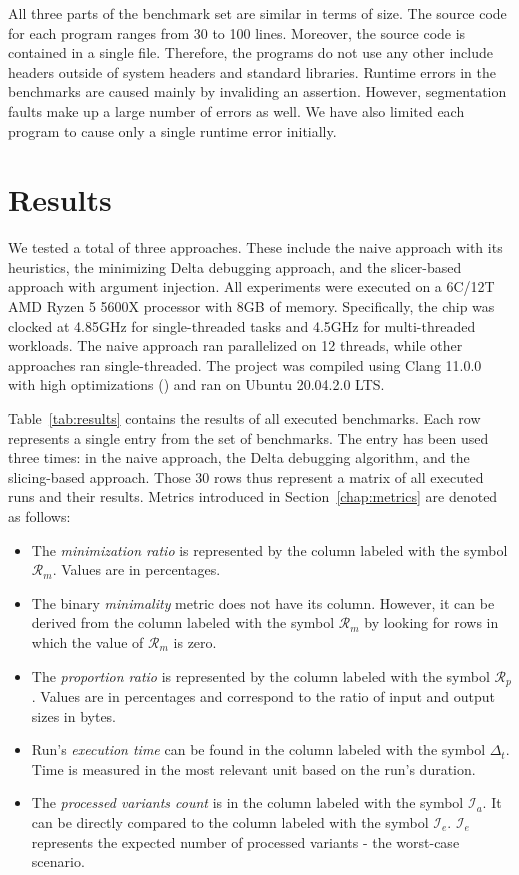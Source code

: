 All three parts of the benchmark set are similar in terms of size. 
The source code for each program ranges from 30 to 100 lines. 
Moreover, the source code is contained in a single file. 
Therefore, the programs do not use any other include headers outside of 
system headers and standard libraries. 
Runtime errors in the benchmarks are caused mainly by invaliding an assertion. 
However, segmentation faults make up a large number of errors as well. 
We have also limited each program to cause only a single runtime error 
initially.

\section{Results}

We tested a total of three approaches. 
These include the naive approach with its heuristics, the minimizing Delta 
debugging approach, and the slicer-based approach 
with argument injection. 
All experiments were executed on a 6C/12T AMD Ryzen 5 5600X processor with 
8GB of memory. 
Specifically, the chip was clocked at 4.85GHz for single-threaded tasks and 
4.5GHz for multi-threaded workloads. 
The naive approach ran parallelized on 12 threads, while other approaches 
ran single-threaded. 
The project was compiled using Clang 11.0.0 with high optimizations 
() and ran on Ubuntu 20.04.2.0 LTS.

Table~\ref{tab:results} contains the results of all executed benchmarks. 
Each row represents a single entry from the set of benchmarks. 
The entry has been used three times: in the naive approach, the Delta 
debugging algorithm, and the slicing-based approach. 
Those 30 rows thus represent a matrix of all executed runs and their results. 
Metrics introduced in Section~\ref{chap:metrics} are denoted as follows:
\begin{itemize}
  \item The \emph{minimization ratio} is represented by the column labeled 
  with the symbol $\mathcal{R}_m$. 
  Values are in percentages.
  \item The binary \emph{minimality} metric does not have its column. 
  However, it can be derived from the column labeled with the symbol
  $\mathcal{R}_m$ by looking for rows in which the value of 
  $\mathcal{R}_m$ is zero.
  \item The \emph{proportion ratio} is represented by the column labeled 
  with the symbol $\mathcal{R}_p$. 
  Values are in percentages and correspond to the ratio of input and output 
  sizes in bytes.
  \item Run's \emph{execution time} can be found in the column labeled with 
  the symbol $\Delta_t$. 
  Time is measured in the most relevant unit based on the run's duration.
  \item The \emph{processed variants count} is in the column labeled with 
  the symbol $\mathcal{I}_a$. 
  It can be directly compared to the column labeled with the symbol 
  $\mathcal{I}_e$. 
  $\mathcal{I}_e$ represents the expected number of processed variants - 
  the worst-case scenario.
\end{itemize}


